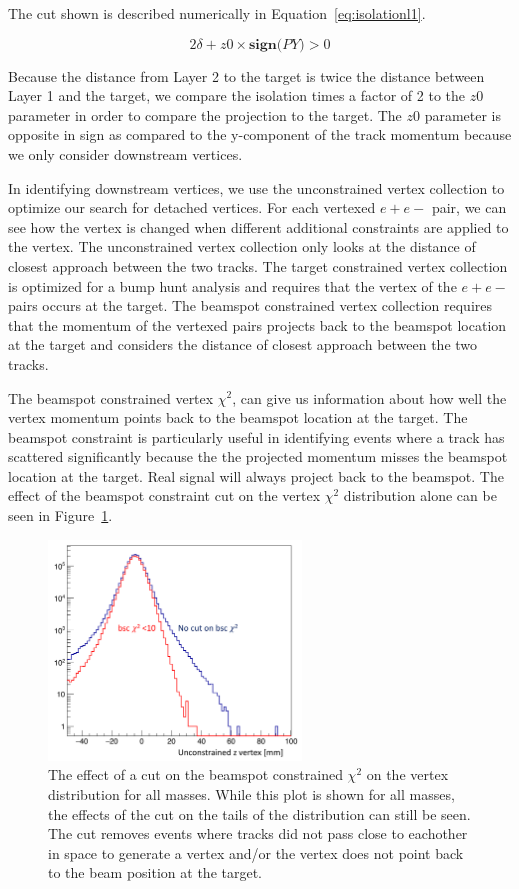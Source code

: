 \documentclass[twoside]{article}
\begin{document}
The cut shown is described numerically in Equation~\eqref{eq:isolationl1}.

\begin{equation}
\label{eq:isolationl1}
2\delta+z0\times\textbf{sign($PY$)}>0
\end{equation}
 
Because the distance from Layer 2 to the target is twice the distance between Layer 1 and the target, we compare the isolation times a factor of 2 to the $z0$ parameter in order to compare the projection to the target. The $z0$ parameter is opposite in sign as compared to the y-component of the track momentum because we only consider downstream vertices. 


\indent In identifying downstream vertices, we use the unconstrained vertex collection to optimize our search for detached vertices. For each vertexed $e+e-$ pair, we can see how the vertex is changed when different additional constraints are applied to the vertex. The unconstrained vertex collection only looks at the distance of closest approach between the two tracks. The target constrained vertex collection is optimized for a bump hunt analysis and requires that the vertex of the $e+e-$ pairs occurs at the target. The beamspot constrained vertex collection requires that the momentum of the vertexed pairs projects back to the beamspot location at the target and considers the distance of closest approach between the two tracks. 

The beamspot constrained vertex $\chi^2$, can give us information about how well the vertex momentum points back to the beamspot location at the target. The beamspot constraint is particularly useful in identifying events where a track has scattered significantly because the the projected momentum misses the beamspot location at the target. Real signal will always project back to the beamspot. The effect of the beamspot constraint cut on the vertex  $\chi^2$ distribution alone can be seen in Figure~\ref{fig:bsccut}.

\begin{figure}[H]
  \centering
      \includegraphics[width=0.6\textwidth]{plots/bscCut.png}
  \caption{The effect of a cut on the beamspot constrained $\chi^2$ on the vertex distribution for all masses. While this plot is shown for all masses, the effects of the cut on the tails of the distribution can still be seen. The cut removes events where tracks did not pass close to eachother in space to generate a vertex and/or the vertex does not point back to the beam position at the target.}
  \label{fig:bsccut}
\end{figure} 
\end{document}
